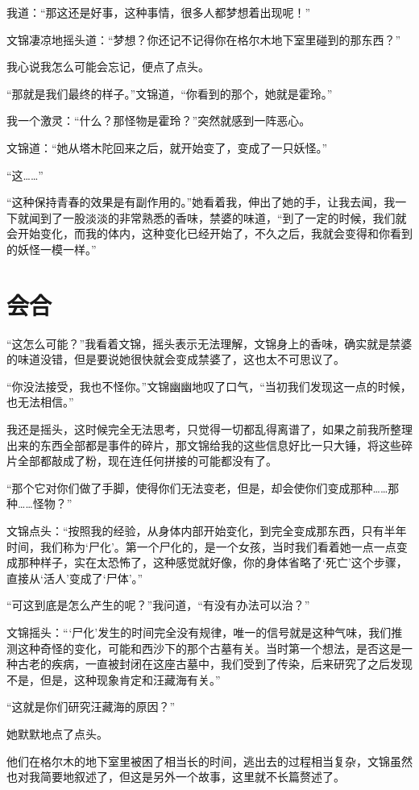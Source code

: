 我道：“那这还是好事，这种事情，很多人都梦想着出现呢！”

文锦凄凉地摇头道：“梦想？你还记不记得你在格尔木地下室里碰到的那东西？”

我心说我怎么可能会忘记，便点了点头。

“那就是我们最终的样子。”文锦道，“你看到的那个，她就是霍玲。”

我一个激灵：“什么？那怪物是霍玲？”突然就感到一阵恶心。

文锦道：“她从塔木陀回来之后，就开始变了，变成了一只妖怪。”

“这……”

“这种保持青春的效果是有副作用的。”她看着我，伸出了她的手，让我去闻，我一下就闻到了一股淡淡的非常熟悉的香味，禁婆的味道，“到了一定的时候，我们就会开始变化，而我的体内，这种变化已经开始了，不久之后，我就会变得和你看到的妖怪一模一样。”

\chapter{会合}

“这怎么可能？”我看着文锦，摇头表示无法理解，文锦身上的香味，确实就是禁婆的味道没错，但是要说她很快就会变成禁婆了，这也太不可思议了。

“你没法接受，我也不怪你。”文锦幽幽地叹了口气，“当初我们发现这一点的时候，也无法相信。”

我还是摇头，这时候完全无法思考，只觉得一切都乱得离谱了，如果之前我所整理出来的东西全部都是事件的碎片，那文锦给我的这些信息好比一只大锤，将这些碎片全部都敲成了粉，现在连任何拼接的可能都没有了。

“那个它对你们做了手脚，使得你们无法变老，但是，却会使你们变成那种……那种……怪物？”

文锦点头：“按照我的经验，从身体内部开始变化，到完全变成那东西，只有半年时间，我们称为‘尸化’。第一个尸化的，是一个女孩，当时我们看着她一点一点变成那种样子，实在太恐怖了，这种感觉就好像，你的身体省略了‘死亡’这个步骤，直接从‘活人’变成了‘尸体’。”

“可这到底是怎么产生的呢？”我问道，“有没有办法可以治？”

文锦摇头：“‘尸化’发生的时间完全没有规律，唯一的信号就是这种气味，我们推测这种奇怪的变化，可能和西沙下的那个古墓有关。当时第一个想法，是否这是一种古老的疾病，一直被封闭在这座古墓中，我们受到了传染，后来研究了之后发现不是，但是，这种现象肯定和汪藏海有关。”

“这就是你们研究汪藏海的原因？”

她默默地点了点头。

他们在格尔木的地下室里被困了相当长的时间，逃出去的过程相当复杂，文锦虽然也对我简要地叙述了，但这是另外一个故事，这里就不长篇赘述了。

